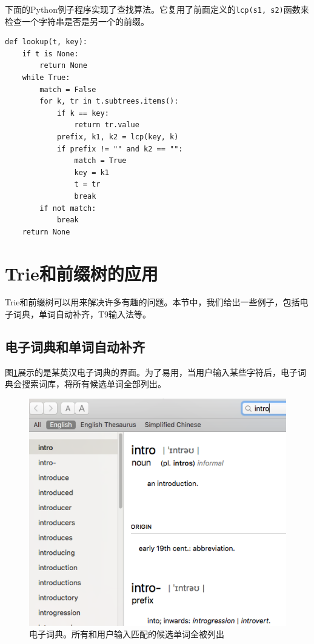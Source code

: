 \documentclass[b5paper]{ctexart}
\begin{document}
下面的Python例子程序实现了查找算法。它复用了前面定义的\texttt{lcp(s1, s2)}函数来检查一个字符串是否是另一个的前缀。

\lstset{language=Python}
\begin{lstlisting}
def lookup(t, key):
    if t is None:
        return None
    while True:
        match = False
        for k, tr in t.subtrees.items():
            if k == key:
                return tr.value
            prefix, k1, k2 = lcp(key, k)
            if prefix != "" and k2 == "":
                match = True
                key = k1
                t = tr
                break
        if not match:
            break
    return None
\end{lstlisting}


\section{Trie和前缀树的应用}

Trie和前缀树可以用来解决许多有趣的问题。本节中，我们给出一些例子，包括电子词典，单词自动补齐，T9输入法等。

\subsection{电子词典和单词自动补齐}
图\ref{fig:e-dict}展示的是某英汉电子词典的界面。为了易用，当用户输入某些字符后，电子词典会搜索词库，将所有候选单词全部列出。

\begin{figure}[htbp]
  \centering
  \includegraphics[scale=0.5]{img/edict-en.png}
  \caption{电子词典。所有和用户输入匹配的候选单词全被列出}
  \label{fig:e-dict}
\end{figure}
\end{document}
